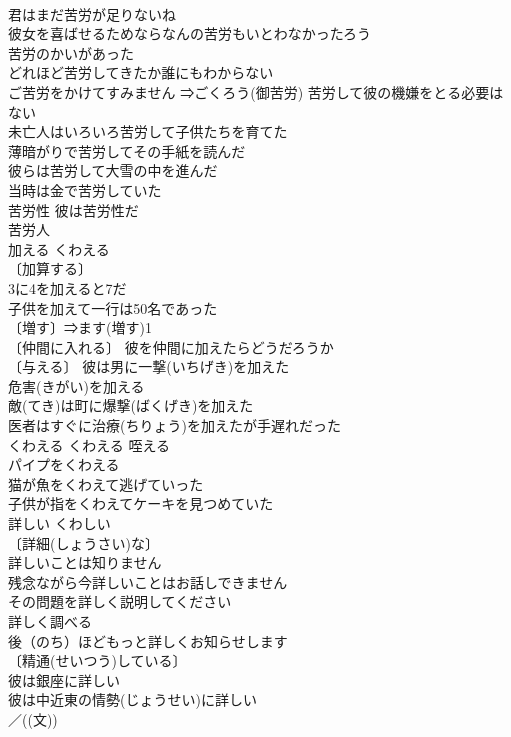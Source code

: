 \documentclass[8pt]{extreport}
\begin{document}
\begin{CJK}{UTF8}{min}
\\	君はまだ苦労が足りないね 
\\	彼女を喜ばせるためならなんの苦労もいとわなかったろう 
\\	苦労のかいがあった 
\\	どれほど苦労してきたか誰にもわからない 
\\	ご苦労をかけてすみません ⇒ごくろう(御苦労) 苦労して彼の機嫌をとる必要はない 
\\	未亡人はいろいろ苦労して子供たちを育てた 
\\	薄暗がりで苦労してその手紙を読んだ 
\\	彼らは苦労して大雪の中を進んだ 
\\	当時は金で苦労していた 
\\	苦労性 彼は苦労性だ 
\\	苦労人 
\\	加える	くわえる	
\\	〔加算する〕
\\	3に4を加えると7だ 
\\	子供を加えて一行は50名であった 
\\	〔増す〕⇒ます(増す)1 
\\	〔仲間に入れる〕 彼を仲間に加えたらどうだろうか 
\\	〔与える〕 彼は男に一撃(いちげき)を加えた 
\\	危害(きがい)を加える 
\\	敵(てき)は町に爆撃(ばくげき)を加えた 
\\	医者はすぐに治療(ちりょう)を加えたが手遅れだった 
\\	くわえる	くわえる	咥える 
\\	パイプをくわえる 
\\	猫が魚をくわえて逃げていった 
\\	子供が指をくわえてケーキを見つめていた 
\\	詳しい	くわしい	
\\	〔詳細(しょうさい)な〕
\\	詳しいことは知りません 
\\	残念ながら今詳しいことはお話しできません 
\\	その問題を詳しく説明してください 
\\	詳しく調べる 
\\	後（のち）ほどもっと詳しくお知らせします 
\\	〔精通(せいつう)している〕　
\\	彼は銀座に詳しい 
\\	彼は中近東の情勢(じょうせい)に詳しい 
\\	／((文)) 

\end{CJK}
\end{document}
